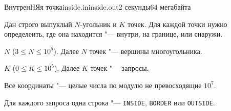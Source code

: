 
\begin{problem}{ВнутренНЯя точка}{inside.in}{inside.out}{2 секунды}{64 мегабайта}

Дан строго выпуклый $N$-угольник и $K$ точек.
Для каждой точки нужно определеить, где она находится "--- внутри, на границе, или снаружи.

\InputFile

$N$ ($3 \le N \le 10^5$). Далее $N$ точек "--- вершины многоугольника.

$K$ ($0 \le K \le 10^5$). Далее $K$ точек "--- запросы.

Все координаты "--- целые числа по модулю не превосходящие $10^7$.

\OutputFile

Для каждого запроса одна строка "--- \texttt{INSIDE}, \texttt{BORDER} или \texttt{OUTSIDE}.

\Examples

\begin{example}
%
\end{example}

\end{problem}
